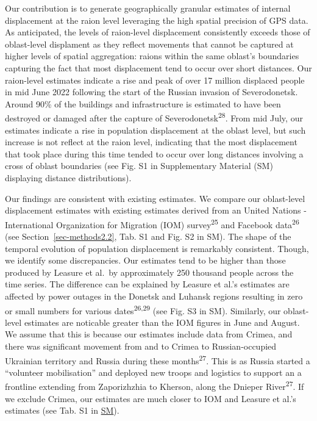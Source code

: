 \documentclass[
  11pt,
]{article}
\begin{document}
Our contribution is to generate geographically granular estimates of
internal displacement at the raion level leveraging the high spatial
precision of GPS data. As anticipated, the levels of raion-level
displacement consistently exceeds those of oblast-level displament as
they reflect movements that cannot be captured at higher levels of
spatial aggregation: raions within the same oblast's boundaries
capturing the fact that most displacement tend to occur over short
distances. Our raion-level estimates indicate a rise and peak of over 17
million displaced people in mid June 2022 following the start of the
Russian invasion of Severodonetsk. Around 90\% of the buildings and
infrastructure is estimated to have been destroyed or damaged after the
capture of Severodonetsk\textsuperscript{28}. From mid July, our
estimates indicate a rise in population displacement at the oblast
level, but such increase is not reflect at the raion level, indicating
that the most displacement that took place during this time tended to
occur over long distances involving a cross of oblast boundaries (see
Fig. S1 in Supplementary Material (SM) displaying distance
distributions).

Our findings are consistent with existing estimates. We compare our
oblast-level displacement estimates with existing estimates derived from
an United Nations - International Organization for Migration (IOM)
survey\textsuperscript{25} and Facebook data\textsuperscript{26} (see
Section~\ref{sec-methods2.2}, Tab. S1 and Fig. S2 in SM). The shape of
the temporal evolution of population displacement is remarkably
consistent. Though, we identify some discrepancies. Our estimates tend
to be higher than those produced by Leasure et al.~by approximately 250
thousand people across the time series. The difference can be explained
by Leasure et al.'s estimates are affected by power outages in the
Donetsk and Luhansk regions resulting in zero or small numbers for
various dates\textsuperscript{26,29} (see Fig. S3 in SM). Similarly, our
oblast-level estimates are noticable greater than the IOM figures in
June and August. We assume that this is because our estimates include
data from Crimea, and there was significant movement from and to Crimea
to Russian-occupied Ukrainian territory and Russia during these
months\textsuperscript{27}. This is as Russia started a ``volunteer
mobilisation'' and deployed new troops and logistics to support an a
frontline extending from Zaporizhzhia to Kherson, along the Dnieper
River\textsuperscript{27}. If we exclude Crimea, our estimates are much
closer to IOM and Leasure et al.'s estimates (see Tab. S1 in
\href{https://github.com/fcorowe/ukraine-pop-displacement/blob/main/manuscript/quarto-file-supplementary.pdf}{SM}).
\end{document}

